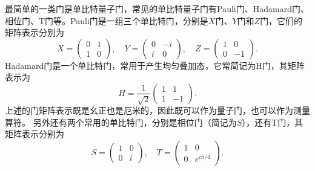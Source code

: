 最简单的一类门是单比特量子门，常见的单比特量子门有Pauli门、Hadamard门、相位门、T门等。Pauli门是一组三个单比特门，分别是$X$门、$Y$门和$Z$门，它们的矩阵表示分别为
\begin{equation}
    X = \begin{pmatrix} 0 & 1 \\ 1 & 0 \end{pmatrix}, \quad Y = \begin{pmatrix} 0 & -i \\ i & 0 \end{pmatrix}, \quad Z = \begin{pmatrix} 1 & 0 \\ 0 & -1 \end{pmatrix}.
\end{equation}
Hadamard门是一个单比特门，常用于产生均匀叠加态，它常简记为H门，其矩阵表示为
\begin{equation}
    H = \frac{1}{\sqrt{2}}\begin{pmatrix} 1 & 1 \\ 1 & -1 \end{pmatrix}.
\end{equation}
上述的门矩阵表示既是幺正也是厄米的，因此既可以作为量子门，也可以作为测量算符。
另外还有两个常用的单比特门，分别是相位门（简记为$S$），还有T门，其矩阵表示分别为
\begin{equation}
    S = \begin{pmatrix} 1 & 0 \\ 0 & i \end{pmatrix}, \quad T = \begin{pmatrix} 1 & 0 \\ 0 & e^{i\pi/4} \end{pmatrix}.
\end{equation}

